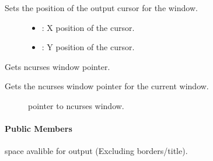 \documentclass[letterpaper,10pt,english]{sphinxmanual}
\begin{document}
\begin{fulllineitems}
\begin{fulllineitems}
Sets the position of the output cursor for the window. \begin{description}
\item[{}] \leavevmode\begin{itemize}
\item {} 
: X position of the cursor. 

\item {} 
: Y position of the cursor. 

\end{itemize}

\end{description}


\end{fulllineitems}


\begin{fulllineitems}
\label{\detokenize{index:_CPPv2N7ostendo6WindowclEv}}%
\pysigstartmultiline
{}\label{\detokenize{index:Pessumclassostendo_1_1Window_1a4a67da930b3dda1951fef1d506d83980}}%
\pysigstopmultiline
Gets ncurses window pointer. 

Gets the ncurses window pointer for the current window. \begin{description}
\item[{}] \leavevmode
pointer to ncurses window. 

\end{description}


\end{fulllineitems}

\paragraph{Public Members}

\begin{fulllineitems}
\label{\detokenize{index:_CPPv2N7ostendo6Window12window_spaceE}}%
\pysigstartmultiline
{}%
\pysigstopmultiline
{\hyperref[\detokenize{index:Pessumclassostendo_1_1Window}]{}} space avalible for output (Excluding borders/title). 


\end{fulllineitems}
\end{fulllineitems}
\end{document}
